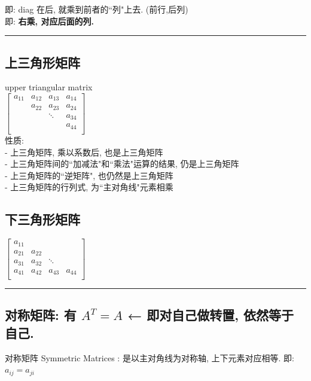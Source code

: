 \documentclass[UTF8]{ctexart}
\begin{document}
即: diag 在后, 就乘到前者的``列"上去. (前行,后列)\\
即: \textbf{右乘, 对应后面的列.} \\

\hrule


\subsection{上三角形矩阵}

upper triangular matrix \\

$
\left[ \begin{matrix}
	a_{11}&		a_{12}&		a_{13}&		a_{14}\\
	&		a_{22}&		a_{23}&		a_{24}\\
	&		&		\ddots&		a_{34}\\
	&		&		&		a_{44}\\
\end{matrix} \right] 
$ \\

性质: \\
- 上三角矩阵, 乘以系数后, 也是上三角矩阵 \\
- 上三角矩阵间的``加减法"和``乘法"运算的结果, 仍是上三角矩阵 \\
- 上三角矩阵的``逆矩阵", 也仍然是上三角矩阵 \\
- 上三角矩阵的行列式, 为``主对角线"元素相乘 


\subsection{下三角形矩阵}

$
\left[ \begin{matrix}
	a_{11}&		&		&		\\
	a_{21}&		a_{22}&		&		\\
	a_{31}&		a_{32}&		\ddots&		\\
	a_{41}&		a_{42}&		a_{43}&		a_{44}\\
\end{matrix} \right] 
$\\


\hrule


\subsection{对称矩阵: 有 $A^T = A$ ← 即对自己做转置, 依然等于自己.}

对称矩阵 Symmetric Matrices : 是以主对角线为对称轴, 上下元素对应相等. 即: $a_{ij}= a_{ji}$ \\
\end{document}

